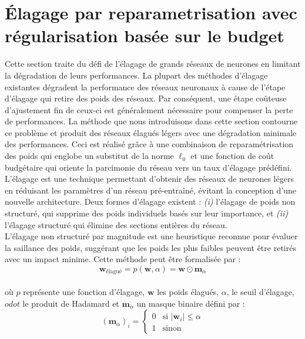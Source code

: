 \section*{Élagage par reparametrisation avec régularisation basée sur le budget}


Cette section traite du défi de l'élagage de grands réseaux de neurones en
limitant la dégradation de leurs performances. La plupart des méthodes d'élagage
existantes dégradent la performance des réseaux neuronaux à cause de l'étape
d'élagage qui retire des poids des réseaux. Par conséquent, une étape coûteuse
d'ajustement fin de ceux-ci est généralement nécessaire pour compenser la perte
de performances. La méthode que nous introduisons dans cette section contourne
ce problème et produit des réseaux élagués légers avec une dégradation minimale
des performances. Ceci est réalisé grâce à une combinaison de reparamétrisation
des poids qui englobe un substitut de la norme $\ell_0$ et une fonction de coût
budgétaire qui oriente la parcimonie du réseau vers un taux d'élagage
prédéfini.\\

L'élagage est une technique permettant d'obtenir des réseaux de neurones légers en
réduisant les paramètres d'un réseau pré-entraîné, évitant la conception d'une
nouvelle architecture. Deux formes d'élagage existent : \textit{(i)} l'élagage
de poids non structuré, qui supprime des poids individuels basés sur leur
importance, et \textit{(ii)} l'élagage structuré qui élimine des sections
entières du réseau.\\

L'élagage non structuré par magnitude est une heuristique reconnue pour évaluer
la saillance des poids, suggérant que les poids les plus faibles peuvent être
retirés avec un impact minime. Cette méthode peut être formalisée par :\\

\begin{equation}
  \mathbf{w}_{\text{élagué}} = p(\mathbf{w}, \alpha) = \mathbf{w} \odot \mathbf{m}_\alpha
\end{equation}\\


\noindent où $p$ représente une fonction d'élagage,  $\mathbf{w}$ les poids
élagués, $\alpha$, le seuil d'élagage, $odot$ le produit de Hadamard et $\mathbf{m}_\alpha$ un masque binaire
défini par :\\

\begin{equation}
  (\mathbf{m}_\alpha)_i = \begin{cases}
    0 & \text{si } |\mathbf{w}_i| \leq \alpha \\
    1 & \text{sinon}
  \end{cases}
\end{equation}\\

